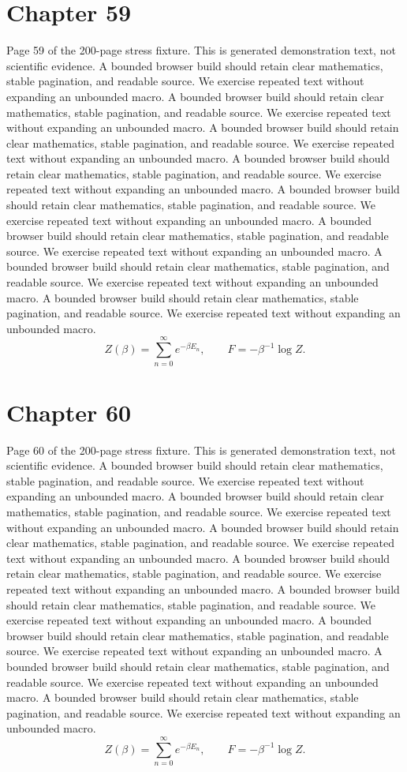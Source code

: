 \documentclass[11pt]{article}
\begin{document}
\section*{Chapter 59}
Page 59 of the 200-page stress fixture. This is generated demonstration text, not scientific evidence.
A bounded browser build should retain clear mathematics, stable pagination, and readable source. We exercise repeated text without expanding an unbounded macro.
A bounded browser build should retain clear mathematics, stable pagination, and readable source. We exercise repeated text without expanding an unbounded macro.
A bounded browser build should retain clear mathematics, stable pagination, and readable source. We exercise repeated text without expanding an unbounded macro.
A bounded browser build should retain clear mathematics, stable pagination, and readable source. We exercise repeated text without expanding an unbounded macro.
A bounded browser build should retain clear mathematics, stable pagination, and readable source. We exercise repeated text without expanding an unbounded macro.
A bounded browser build should retain clear mathematics, stable pagination, and readable source. We exercise repeated text without expanding an unbounded macro.
A bounded browser build should retain clear mathematics, stable pagination, and readable source. We exercise repeated text without expanding an unbounded macro.
A bounded browser build should retain clear mathematics, stable pagination, and readable source. We exercise repeated text without expanding an unbounded macro.
\[Z(\beta)=\sum_{n=0}^{\infty}e^{-\beta E_n},\qquad F=-\beta^{-1}\log Z.\]
\newpage
\section*{Chapter 60}
Page 60 of the 200-page stress fixture. This is generated demonstration text, not scientific evidence.
A bounded browser build should retain clear mathematics, stable pagination, and readable source. We exercise repeated text without expanding an unbounded macro.
A bounded browser build should retain clear mathematics, stable pagination, and readable source. We exercise repeated text without expanding an unbounded macro.
A bounded browser build should retain clear mathematics, stable pagination, and readable source. We exercise repeated text without expanding an unbounded macro.
A bounded browser build should retain clear mathematics, stable pagination, and readable source. We exercise repeated text without expanding an unbounded macro.
A bounded browser build should retain clear mathematics, stable pagination, and readable source. We exercise repeated text without expanding an unbounded macro.
A bounded browser build should retain clear mathematics, stable pagination, and readable source. We exercise repeated text without expanding an unbounded macro.
A bounded browser build should retain clear mathematics, stable pagination, and readable source. We exercise repeated text without expanding an unbounded macro.
A bounded browser build should retain clear mathematics, stable pagination, and readable source. We exercise repeated text without expanding an unbounded macro.
\[Z(\beta)=\sum_{n=0}^{\infty}e^{-\beta E_n},\qquad F=-\beta^{-1}\log Z.\]
\newpage
\end{document}
